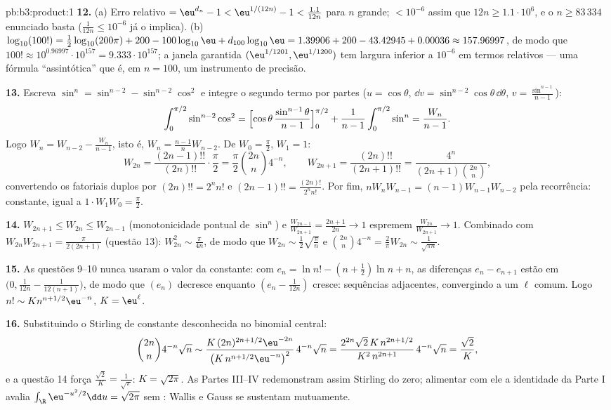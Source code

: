 \begin{solution}{pb:b3:product:1}
\textbf{12.} (a) Erro relativo $= \eu^{d_n} - 1 <
\eu^{1/(12n)} - 1 < \frac{1.1}{12n}$ para $n$ grande; $<
10^{-6}$ assim que $12n \geq 1.1\cdot10^6$, e o
$n \geq 83\,334$ enunciado basta ($\frac1{12n} \leq 10^{-6}$
já o implica). (b) $\log_{10}(100!) =
\frac12\log_{10}(200\pi) + 200 - 100\log_{10}\eu +
d_{100}\log_{10}\eu = 1.39906 + 200 - 43.42945 + 0.00036
\approx 157.96997$, de modo que $100! \approx 10^{0.96997} \cdot
10^{157} = 9.333\cdot10^{157}$; a janela garantida
$(\eu^{1/1201}, \eu^{1/1200})$ tem largura inferior a $10^{-6}$ em
termos relativos --- uma fórmula ``assintótica'' que é, em $n =
100$, um instrumento de precisão.

\textbf{13.} Escreva $\sin^n = \sin^{n-2} - \sin^{n-2}\cos^2$
e integre o segundo termo por partes ($u = \cos\theta$,
$\dd v = \sin^{n-2}\cos\theta\,\dd\theta$, $v =
\frac{\sin^{n-1}}{n-1}$):
\[
\int_0^{\pi/2}\sin^{n-2}\cos^2 =
\Bigl[\cos\theta\,\frac{\sin^{n-1}\theta}{n-1}\Bigr]_0^{\pi/2}
+ \frac1{n-1}\int_0^{\pi/2}\sin^n = \frac{W_n}{n-1} .
\]
Logo $W_n = W_{n-2} - \frac{W_n}{n-1}$, isto é, $W_n =
\frac{n-1}nW_{n-2}$. De $W_0 = \frac\pi2$, $W_1 = 1$:
\[
W_{2n} = \frac{(2n-1)!!}{(2n)!!}\cdot\frac\pi2
= \frac\pi2\binom{2n}n4^{-n},
\qquad
W_{2n+1} = \frac{(2n)!!}{(2n+1)!!}
= \frac{4^n}{(2n+1)\binom{2n}n},
\]
convertendo os fatoriais duplos por $(2n)!! = 2^nn!$ e
$(2n-1)!! = \frac{(2n)!}{2^nn!}$. Por fim, $nW_nW_{n-1} =
(n-1)W_{n-1}W_{n-2}$ pela recorrência: constante, igual a
$1\cdot W_1W_0 = \frac\pi2$.

\textbf{14.} $W_{2n+1} \leq W_{2n} \leq W_{2n-1}$ (monotonicidade
pontual de $\sin^n$) e $\frac{W_{2n-1}}{W_{2n+1}} =
\frac{2n+1}{2n} \to 1$ espremem $\frac{W_{2n}}{W_{2n+1}} \to
1$. Combinado com $W_{2n}W_{2n+1} = \frac{\pi}{2(2n+1)}$
(questão 13): $W_{2n}^2 \sim \frac\pi{4n}$, de modo que $W_{2n} \sim
\frac12\sqrt{\frac\pi n}$ e $\binom{2n}n4^{-n} =
\frac2\pi W_{2n} \sim \frac1{\sqrt{\pi n}}$.

\textbf{15.} As questões 9--10 nunca usaram o valor da
constante: com $e_n = \ln n! - (n+\frac12)\ln n + n$, as
diferenças $e_n - e_{n+1}$ estão em $\bigl(0, \frac1{12n} -
\frac1{12(n+1)}\bigr)$, de modo que $(e_n)$ decresce enquanto $(e_n -
\frac1{12n})$ cresce: sequências adjacentes, convergindo a um
$\ell$ comum. Logo $n! \sim K n^{n+1/2}\eu^{-n}$, $K =
\eu^\ell$.

\textbf{16.} Substituindo o Stirling de constante desconhecida no
binomial central:
\[
\binom{2n}n4^{-n}\sqrt n \sim
\frac{K\,(2n)^{2n+1/2}\eu^{-2n}}{\bigl(K\,n^{n+1/2}
\eu^{-n}\bigr)^2}\,4^{-n}\sqrt n
= \frac{2^{2n}\sqrt{2}\,K\,n^{2n+1/2}}{K^2\,n^{2n+1}}
\,4^{-n}\sqrt n = \frac{\sqrt2}{K},
\]
e a questão 14 força $\frac{\sqrt2}K = \frac1{\sqrt\pi}$:
$K = \sqrt{2\pi}$. As Partes III--IV redemonstram assim Stirling do
zero; alimentar com ele a identidade da Parte I avalia
$\int_\R\eu^{-u^2/2}\dd u = \sqrt{2\pi}$ sem : Wallis e Gauss se sustentam mutuamente.


\end{solution}
